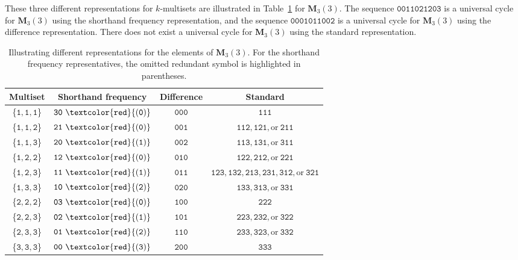 \documentclass[US-letter,USenglish,authorcolumns,autoref]{lipics-v2021}
\renewcommand{\tt} {\mathtt}
\newcommand{\bM}{\mathbf{M}}
\begin{document}
%
These three different representations for $k$-multisets are illustrated in Table~\ref{tab:reps2} for $\bM_3(3)$.
The sequence $\tt{0011021203}$ is a universal cycle for $\mathbf{M}_3(3)$ using the shorthand frequency representation, and the sequence $\tt{0001011002}$
is a universal cycle for $\mathbf{M}_3(3)$ using the difference representation.  
There does not exist a universal cycle for $\mathbf{M}_3(3)$ using the standard representation. 




\begin{table}[h] 
    \centering
    \begin{tabular}{c|c|c|c}
        \multicolumn{1}{c|}{\bf Multiset} & \multicolumn{1}{c|}{\bf Shorthand frequency} & \multicolumn{1}{c|}{\bf Difference} & \multicolumn{1}{c}{\bf Standard}  \\
        \hline
        \{$\tt{1,1,1}$\}  & $\tt{30~\textcolor{red}{(0)}}$ & $\tt{000}$ & $\tt{111}$ \\
        \{$\tt{1,1,2}$\}  & $\tt{21~\textcolor{red}{(0)}}$ & $\tt{001}$ & $\tt{112,121,\mathrm{or~}211}$\\
        \{$\tt{1,1,3}$\}  & $\tt{20~\textcolor{red}{(1)}}$ & $\tt{002}$ & $\tt{113,131,\mathrm{or~}311}$\\
        \{$\tt{1,2,2}$\}  & $\tt{12~\textcolor{red}{(0)}}$ & $\tt{010}$ & $\tt{122,212,\mathrm{or~}221}$\\
        \{$\tt{1,2,3}$\}  & $\tt{11~\textcolor{red}{(1)}}$ & $\tt{011}$ & $\tt{123,132,213,231,312,\mathrm{or~}321}$\\
        \{$\tt{1,3,3}$\}  & $\tt{10~\textcolor{red}{(2)}}$ & $\tt{020}$& $\tt{133,313,\mathrm{or~}331}$\\
        \{$\tt{2,2,2}$\}  & $\tt{03~\textcolor{red}{(0)}}$ &  $\tt{100}$& $\tt{222}$\\
        \{$\tt{2,2,3}$\}  & $\tt{02~\textcolor{red}{(1)}}$ &  $\tt{101}$& $\tt{223,232,\mathrm{or~}322}$ \\
        \{$\tt{2,3,3}$\}  & $\tt{01~\textcolor{red}{(2)}}$ &  $\tt{110}$& $\tt{233,323,\mathrm{or~}332}$ \\
        \{$\tt{3,3,3}$\}  & $\tt{00~\textcolor{red}{(3)}}$ &  $\tt{200}$& $\tt{333}$ \\
    
    \end{tabular}
    \caption{Illustrating different representations for the elements of $\mathbf{M}_3(3)$. For the shorthand frequency representatives, the omitted redundant symbol is highlighted in parentheses.} 
    \label{tab:reps2}
\end{table}
\end{document}
